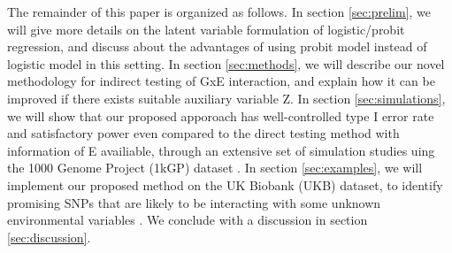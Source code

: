 The remainder of this paper is organized as follows. In section \ref{sec:prelim}, we will give more details on the latent variable formulation of logistic/probit regression, and discuss about the advantages of using probit model instead of logistic model in this setting. In section \ref{sec:methods}, we will describe our novel methodology for indirect testing of GxE interaction, and explain how it can be improved if there exists suitable auxiliary variable Z. In section \ref{sec:simulations}, we will show that our proposed apporoach has well-controlled type I error rate and satisfactory power even compared to the direct testing method with information of E availiable, through an extensive set of simulation studies uing the 1000 Genome Project (1kGP) dataset \citep{1KGP}. In section \ref{sec:examples}, we will implement our proposed method on the UK Biobank (UKB) dataset, to identify promising SNPs that are likely to be interacting with some unknown environmental variables \citep{UKB}. We conclude with a discussion in section \ref{sec:discussion}.



